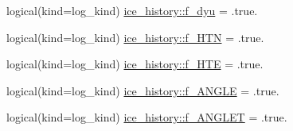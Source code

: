 \begin{DoxyCompactItemize}
\item 
logical(kind=log\_\-kind) \hyperlink{namespaceice__history_a5fe48a0bc8e7dcdbe8689feadd8cdd70}{ice\_\-history::f\_\-dyu} = .true.
\item 
logical(kind=log\_\-kind) \hyperlink{namespaceice__history_a7e63313bc71fed15ff1d16cbaf4d74ea}{ice\_\-history::f\_\-HTN} = .true.
\item 
logical(kind=log\_\-kind) \hyperlink{namespaceice__history_ac61273f25f1bb3b60c8cc5c55c8fd490}{ice\_\-history::f\_\-HTE} = .true.
\item 
logical(kind=log\_\-kind) \hyperlink{namespaceice__history_ae355872badcbed142dd282929330dae7}{ice\_\-history::f\_\-ANGLE} = .true.
\item 
logical(kind=log\_\-kind) \hyperlink{namespaceice__history_a31c241b97efeccd9b191577aa4bf3b4a}{ice\_\-history::f\_\-ANGLET} = .true.
\end{DoxyCompactItemize}
